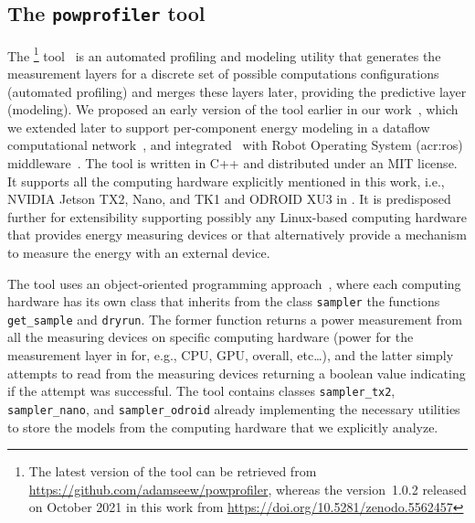 \subsection{The {\tt powprofiler} tool}
\label{sec:powprof}

The \powprof{}\footnote{The latest version of the tool can be retrieved from \url{https://github.com/adamseew/powprofiler}, whereas the version~1.0.2 released on October 2021 in this work from \url{https://doi.org/10.5281/zenodo.5562457}} tool~\citep{powprofiler} is an automated profiling and modeling utility that generates the measurement layers for a discrete set of possible computations configurations (automated profiling) and merges these layers later, providing the predictive layer (modeling). We proposed an early version of the tool earlier in our work~\citep{teamplayd43,seewald2019coarse}, which we extended later to support per-component energy modeling in a dataflow computational network~\citep{seewald2019component}, and integrated~\citep{zamanakos2020energy} with Robot Operating System (\Gls{acr:ros}) middleware~\citep{quigley2009ros}. The tool is written in C++ and distributed under an MIT license. It supports all the computing hardware explicitly mentioned in this work, i.e., NVIDIA Jetson TX2, Nano, and TK1 and ODROID XU3 in . It is predisposed further for extensibility supporting possibly any Linux-based computing hardware that provides energy measuring devices or that alternatively provide a mechanism to measure the energy with an external device.

The tool uses an object-oriented programming approach~\citep{stroustrup1988what,wegner1990concepts}, where each computing hardware has its own class that inherits from the class {\small\tt sampler} the functions {\small\tt get\_sample} and {\small\tt dryrun}. The former function returns a power measurement from all the measuring devices on specific computing hardware (power for the measurement layer in  for, e.g., CPU, GPU, overall, etc\dots), and the latter simply attempts to read from the measuring devices returning a boolean value indicating if the attempt was successful. The tool contains classes {\small\tt sampler\_tx2}, {\small\tt sampler\_nano}, and {\small\tt sampler\_odroid} already implementing the necessary utilities to store the models from the computing hardware that we explicitly analyze.

